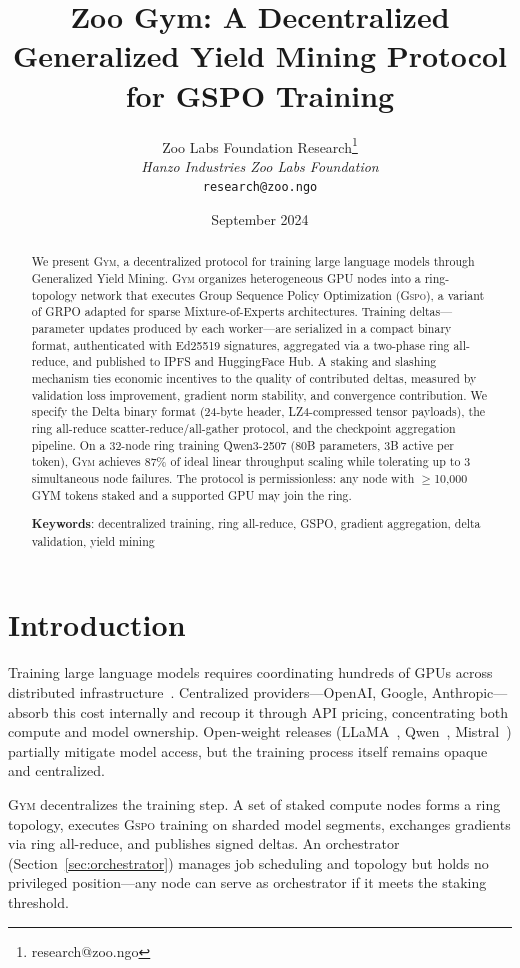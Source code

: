 \documentclass[11pt,letterpaper]{article}
\title{\textbf{Zoo Gym: A Decentralized Generalized Yield Mining Protocol\\for GSPO Training}}
\author{
Zoo Labs Foundation Research\thanks{research@zoo.ngo}\\
\textit{Hanzo Industries \quad Zoo Labs Foundation}\\
\texttt{research@zoo.ngo}
}
\date{September 2024}
\newcommand{\GYM}{\textsc{Gym}}
\newcommand{\GSPO}{\textsc{Gspo}}
\begin{document}
\zoocoverpage

\begin{abstract}
We present \GYM{}, a decentralized protocol for training large language models through Generalized Yield Mining.  \GYM{} organizes heterogeneous GPU nodes into a ring-topology network that executes Group Sequence Policy Optimization (\GSPO{}), a variant of GRPO adapted for sparse Mixture-of-Experts architectures.  Training deltas---parameter updates produced by each worker---are serialized in a compact binary format, authenticated with Ed25519 signatures, aggregated via a two-phase ring all-reduce, and published to IPFS and HuggingFace Hub.  A staking and slashing mechanism ties economic incentives to the quality of contributed deltas, measured by validation loss improvement, gradient norm stability, and convergence contribution.  We specify the Delta binary format (24-byte header, LZ4-compressed tensor payloads), the ring all-reduce scatter-reduce/all-gather protocol, and the checkpoint aggregation pipeline.  On a 32-node ring training Qwen3-2507 (80B parameters, 3B active per token), \GYM{} achieves 87\% of ideal linear throughput scaling while tolerating up to 3 simultaneous node failures.  The protocol is permissionless: any node with $\geq$10{,}000 GYM tokens staked and a supported GPU may join the ring.

\textbf{Keywords}: decentralized training, ring all-reduce, GSPO, gradient aggregation, delta validation, yield mining
\end{abstract}

\section{Introduction}
\label{sec:intro}

Training large language models requires coordinating hundreds of GPUs across distributed infrastructure~\cite{shoeybi2019megatron,ren2021zerooffload}.  Centralized providers---OpenAI, Google, Anthropic---absorb this cost internally and recoup it through API pricing, concentrating both compute and model ownership.  Open-weight releases (LLaMA~\cite{touvron2023llama}, Qwen~\cite{qwen2024qwen25}, Mistral~\cite{jiang2023mistral}) partially mitigate model access, but the training process itself remains opaque and centralized.

\GYM{} decentralizes the training step.  A set of staked compute nodes forms a ring topology, executes \GSPO{} training on sharded model segments, exchanges gradients via ring all-reduce, and publishes signed deltas.  An orchestrator (Section~\ref{sec:orchestrator}) manages job scheduling and topology but holds no privileged position---any node can serve as orchestrator if it meets the staking threshold.
\end{document}
